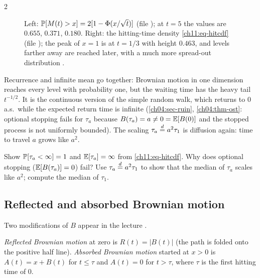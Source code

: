 \begin{paracol}{2}
\begin{figure}[ht]
\caption{Left: $\mathbb{P}[M(t)>x]=2[1-\Phi(x/\sqrt t)]$ (file ); at $t=5$ the values are $0.655$, $0.371$, $0.180$.
Right: the hitting-time density \eqref{ch11:eq-hitcdf} (file ); the peak of $x=1$ is at $t=1/3$ with height
$0.463$, and levels farther away are reached later, with a much more spread-out distribution
.}\label{ch11:fig-max}
\end{figure}

\begin{intuition}
Recurrence and infinite mean go together: Brownian motion in one dimension reaches every level with probability one,
but the waiting time has the heavy tail $t^{-1/2}$. It is the continuous version of the simple random walk, which returns
to $0$ a.s.\ while the expected return time is infinite (\cref{ch04:sec-ruin}, \cref{ch04:thm-ost}: optional stopping fails for $\tau_a$ because
$B(\tau_a)=a\ne0=\mathbb{E}[B(0)]$ and the stopped process is not uniformly bounded).
The scaling $\tau_a\stackrel{d}{=} a^2\tau_1$ is diffusion again: time to travel $a$ grows like $a^2$.
\end{intuition}

\begin{exercise}\label{ch11:ex-tau}
Show $\mathbb{P}[\tau_a<\infty]=1$ and $\mathbb{E}[\tau_a]=\infty$ from \eqref{ch11:eq-hitcdf}. Why does optional stopping ($\mathbb{E}[B(\tau_a)]=0$)
fail? Use $\tau_a\stackrel{d}{=} a^2\tau_1$ to show that the median of $\tau_a$ scales like $a^2$; compute the median of $\tau_1$.
\end{exercise}

\subsection{Reflected and absorbed Brownian motion}\label{ch11:sec-absorbed}
Two modifications of $B$ appear in the lecture .

\begin{definition}\label{ch11:def-refabs}
\emph{Reflected Brownian motion} at zero is $R(t)=|B(t)|$ (the path is folded onto the positive half line).
\emph{Absorbed Brownian motion} started at $x>0$ is $A(t)=x+B(t)$ for $t\le\tau$ and $A(t)=0$ for $t>\tau$, where $\tau$ is
the first hitting time of $0$.
\end{definition}


\end{paracol}
